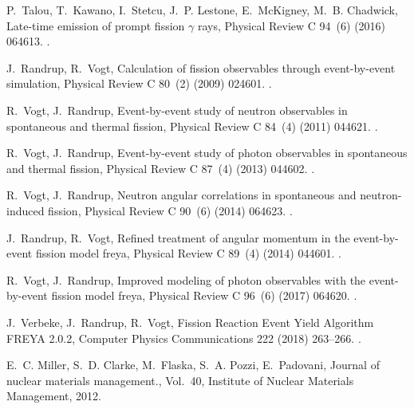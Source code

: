 \documentclass[preprint,12pt]{elsarticle}
\begin{document}
\begin{thebibliography}{10}
	P.~Talou, T.~Kawano, I.~Stetcu, J.~P. Lestone, E.~McKigney, M.~B. Chadwick,
	{Late-time emission of prompt fission $\gamma$ rays}, Physical Review C
	94~(6) (2016) 064613.
	\newblock \href {https://doi.org/10.1103/PhysRevC.94.064613}
	{}.
	
	J.~Randrup, R.~Vogt, {Calculation of fission observables through event-by-event
		simulation}, Physical Review C 80~(2) (2009) 024601.
	\newblock \href {https://doi.org/10.1103/PhysRevC.80.024601}
	{}.
	
	R.~Vogt, J.~Randrup, {Event-by-event study of neutron observables in
		spontaneous and thermal fission}, Physical Review C 84~(4) (2011) 044621.
	\newblock \href {https://doi.org/10.1103/PhysRevC.84.044621}
	{}.
	
	R.~Vogt, J.~Randrup, {Event-by-event study of photon observables in spontaneous
		and thermal fission}, Physical Review C 87~(4) (2013) 044602.
	\newblock \href {https://doi.org/10.1103/PhysRevC.87.044602}
	{}.
	
	R.~Vogt, J.~Randrup, {Neutron angular correlations in spontaneous and
		neutron-induced fission}, Physical Review C 90~(6) (2014) 064623.
	\newblock \href {https://doi.org/10.1103/PhysRevC.90.064623}
	{}.
	
	J.~Randrup, R.~Vogt, {Refined treatment of angular momentum in the
		event-by-event fission model freya}, Physical Review C 89~(4) (2014) 044601.
	\newblock \href {https://doi.org/10.1103/PhysRevC.89.044601}
	{}.
	
	R.~Vogt, J.~Randrup, {Improved modeling of photon observables with the
		event-by-event fission model freya}, Physical Review C 96~(6) (2017) 064620.
	\newblock \href {https://doi.org/10.1103/PhysRevC.96.064620}
	{}.
	
	J.~Verbeke, J.~Randrup, R.~Vogt, {Fission Reaction Event Yield Algorithm FREYA
		2.0.2}, Computer Physics Communications 222 (2018) 263--266.
	\newblock \href {https://doi.org/10.1016/J.CPC.2017.09.006}
	{}.
	
	E.~C. Miller, S.~D. Clarke, M.~Flaska, S.~A. Pozzi, E.~Padovani, {Journal of
		nuclear materials management.}, Vol.~40, Institute of Nuclear Materials
	Management, 2012.
	

\end{thebibliography}
\end{document}
